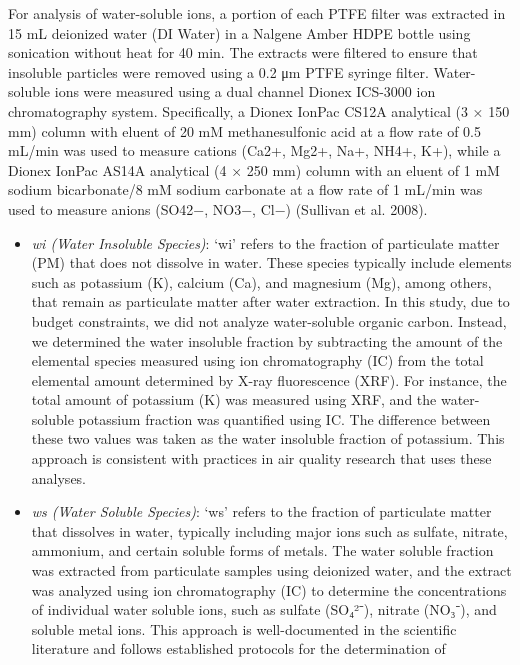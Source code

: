 \documentclass[
  letterpaper,
  DIV=11,
  numbers=noendperiod]{scrartcl}
\begin{document}
For analysis of water-soluble ions, a portion of each PTFE filter was
extracted in 15 mL deionized water (DI Water) in a Nalgene Amber HDPE
bottle using sonication without heat for 40 min. The extracts were
filtered to ensure that insoluble particles were removed using a 0.2 μm
PTFE syringe filter. Water-soluble ions were measured using a dual
channel Dionex ICS-3000 ion chromatography system. Specifically, a
Dionex IonPac CS12A analytical (3 × 150 mm) column with eluent of 20 mM
methanesulfonic acid at a flow rate of 0.5 mL/min was used to measure
cations (Ca2+, Mg2+, Na+, NH4+, K+), while a Dionex IonPac AS14A
analytical (4 × 250 mm) column with an eluent of 1 mM sodium
bicarbonate/8 mM sodium carbonate at a flow rate of 1 mL/min was used to
measure anions (SO42−, NO3−, Cl−) (Sullivan et al. 2008).

\begin{itemize}
\item
  \emph{wi (Water Insoluble Species)}: `wi' refers to the
  fraction of particulate matter (PM) that does not dissolve in water.
  These species typically include elements such as potassium (K),
  calcium (Ca), and magnesium (Mg), among others, that remain as
  particulate matter after water extraction. In this study, due to
  budget constraints, we did not analyze water-soluble organic carbon.
  Instead, we determined the water insoluble fraction by subtracting the
  amount of the elemental species measured using ion chromatography (IC)
  from the total elemental amount determined by X-ray fluorescence
  (XRF). For instance, the total amount of potassium (K) was measured
  using XRF, and the water-soluble potassium fraction was quantified
  using IC. The difference between these two values was taken as the
  water insoluble fraction of potassium. This approach is consistent
  with practices in air quality research that uses these analyses.
\item
  \emph{ws (Water Soluble Species)}: `ws' refers to the fraction of
  particulate matter that dissolves in water, typically including major
  ions such as sulfate, nitrate, ammonium, and certain soluble forms of
  metals. The water soluble fraction was extracted from particulate
  samples using deionized water, and the extract was analyzed using ion
  chromatography (IC) to determine the concentrations of individual
  water soluble ions, such as sulfate (SO₄²⁻), nitrate (NO₃⁻), and
  soluble metal ions. This approach is well-documented in the scientific
  literature and follows established protocols for the determination of

\end{itemize}
\end{document}
